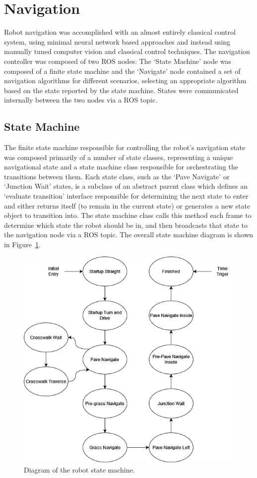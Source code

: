 \documentclass[titlepage, twocolumn]{article}
\begin{document}
\section{Navigation}
    Robot navigation was accomplished with an almost entirely classical control system, using minimal neural network based approaches and instead using manually tuned computer vision and classical control techniques. 
    The navigation controller was composed of two ROS nodes: The `State Machine' node was composed of a finite state machine and the `Navigate' node contained a set of navigation algorithms for different scenarios, selecting an appropriate algorithm based on the state reported by the state machine. States were communicated internally between the two nodes via a ROS topic.
    
    \subsection{State Machine}
        The finite state machine responsible for controlling the robot's navigation state was composed primarily of a number of state classes, representing a unique navigational state and a state machine class responsible for orchestrating the transitions between them. Each state class, such as the `Pave Navigate' or `Junction Wait' states, is a subclass of an abstract parent class which defines an `evaluate transition' interface responsible for determining the next state to enter and either returns itself (to remain in the current state) or generates a new state object to transition into. 
        The state machine class calls this method each frame to determine which state the robot should be in, and then broadcasts that state to the navigation node via a ROS topic. The overall state machine diagram is shown in Figure~\ref{fig:statemachine}.

        \begin{figure}
            \centering
            \includegraphics[width=0.8\linewidth]{statemachine.png}
            \caption{Diagram of the robot state machine.}
            \label{fig:statemachine}
        \end{figure}
\end{document}

